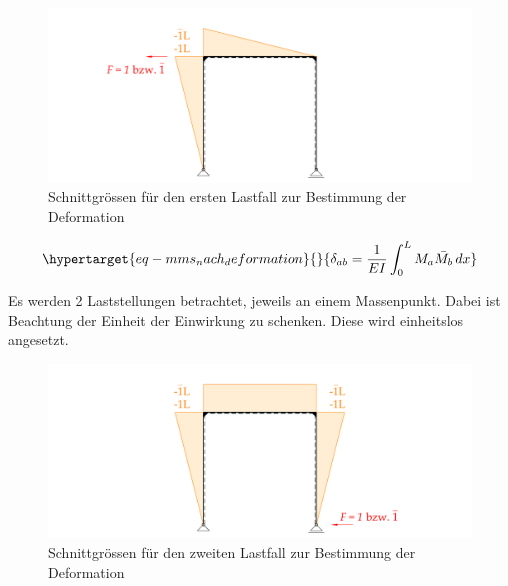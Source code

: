 \documentclass[
  letterpaper,
  DIV=11]{scrreprt}
\begin{document}
\begin{figure}[H]

{\centering \includegraphics{index_files/mediabag/bilder/aufgabe_mms_nach_schnittgroessen1.pdf}

}

\caption{\label{fig-mms_nach_schnittgrössen1}Schnittgrössen für den
ersten Lastfall zur Bestimmung der Deformation}

\end{figure}

\begin{equation}\protect\hypertarget{eq-mms_nach_deformation}{}{
\delta_{ab} = \frac{1}{EI}\int_{0}^{L} M_a\bar{M_b} \,dx
}\label{eq-mms_nach_deformation}\end{equation}

Es werden 2 Laststellungen betrachtet, jeweils an einem Massenpunkt.
Dabei ist Beachtung der Einheit der Einwirkung zu schenken. Diese wird
einheitslos angesetzt.

\begin{figure}[H]

{\centering \includegraphics{index_files/mediabag/bilder/aufgabe_mms_nach_schnittgroessen2.pdf}

}

\caption{\label{fig-mms_nach_schnittgrössen2}Schnittgrössen für den
zweiten Lastfall zur Bestimmung der Deformation}

\end{figure}
\end{document}
